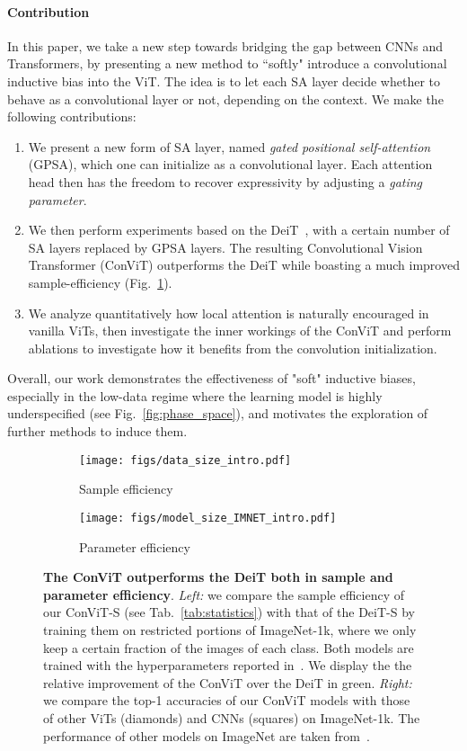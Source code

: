 \paragraph{Contribution}
In this paper, we take a new step towards bridging the gap between CNNs and Transformers, by presenting a new method to ``softly" introduce a convolutional inductive bias into the ViT. The idea is to let each SA layer decide whether to behave as a convolutional layer or not, depending on the context. We make the following contributions:
\begin{enumerate}[noitemsep,labelindent=0pt]
    \item We present a new form of SA layer, named \emph{gated positional self-attention} (GPSA), which one can initialize as a convolutional layer. Each attention head then has the freedom to recover expressivity by adjusting a \emph{gating parameter}.
    \item We then perform experiments based on the DeiT~\cite{touvron2020training}, with a certain number of SA layers replaced by GPSA layers. The resulting Convolutional Vision Transformer (ConViT) outperforms the DeiT while boasting a much improved sample-efficiency (Fig.~\ref{fig:sota}). 
    \item We analyze quantitatively how local attention is naturally encouraged in vanilla ViTs, then investigate the inner workings of the ConViT and perform ablations to investigate how it benefits from the convolution initialization.
\end{enumerate}

Overall, our work demonstrates the effectiveness of "soft" inductive biases, especially in the low-data regime where the learning model is highly underspecified (see Fig.~\ref{fig:phase_space}), and motivates the exploration of further methods to induce them. 

\begin{figure}[t]
    \centering
    \begin{subfigure}[b]{.49\columnwidth}
    \texttt{[image: figs/data\_size\_intro.pdf]}    
    \caption{Sample efficiency}
    \end{subfigure}
    \begin{subfigure}[b]{.49\columnwidth}
    \texttt{[image: figs/model\_size\_IMNET\_intro.pdf]}    
    \caption{Parameter efficiency}
    \end{subfigure}
\caption{\textbf{The ConViT outperforms the DeiT both in sample and parameter efficiency}. \textit{Left:} we compare the sample efficiency of our ConViT-S (see Tab.~\ref{tab:statistics}) with that of the DeiT-S by training them on restricted portions of ImageNet-1k, where we only keep a certain fraction of the images of each class. Both models are trained with the hyperparameters reported in~\cite{touvron2020training}. We display the the relative improvement of the ConViT over the DeiT in green. \textit{Right:} we compare the top-1 accuracies of our ConViT models with those of other ViTs (diamonds) and CNNs (squares) on ImageNet-1k. The performance of other models on ImageNet are taken from~\cite{touvron2020training,he2016deep,tan2019efficientnet,wu_visual_2020,yuan2021tokens}.}
    \label{fig:sota}
\end{figure}

